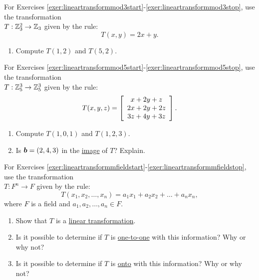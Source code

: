 \begin{multicols}{2}
\noindent For Exercises \ref{exer:lineartransformmod3start}-\ref{exer:lineartransformmod3stop}, use the transformation\\ $T : \Z_3^2 \to \Z_3$ given by the rule:
\[T(x, y) = 2x+y.\] 
\begin{enumerate}[!HW!]
\item\label{exer:lineartransformmod3start}\label{exer:lineartransformmod3stop} Compute $T(1,2)$ and $T(5,2)$. %
\end{enumerate} \mbox{}\columnbreak

\noindent For Exercises \ref{exer:lineartransformmod5start}-\ref{exer:lineartransformmod5stop}, use the transformation\\ $T : \Z_5^3 \to \Z_5^3$ given by the rule:
\[T(x, y, z) = \mtx{c}{x+2y+z\\ 2x+2y+2z\\ 3z+4y+3z}.\] 
\begin{enumerate}[!HW!]
\item\label{exer:lineartransformmod5start} Compute $T(1,0,1)$ and $T(1,2,3)$. %
\item \label{exer:lineartransformmod5stop} Is $\bb b = (2,4,3)$ in the \hyperref[def:linear]{image} of $T$? Explain. %
\end{enumerate}
\end{multicols}

\noindent For Exercises \ref{exer:lineartransformmfieldstart}-\ref{exer:lineartransformmfieldstop}, use the transformation\\ $T : F^n \to F$ given by the rule:
\[T(x_1, x_2, \ldots, x_n) = a_1x_1+a_2x_2+\ldots+a_nx_n,\] where $F$ is a field and $a_1, a_2, \ldots, a_n\in F$.
\begin{enumerate}[!HW!]
\item\label{exer:lineartransformmfieldstart} Show that $T$ is a \hyperref[def:linear]{linear transformation}.
\item Is it possible to determine if $T$ is \hyperref[def:injective]{one-to-one} with this information? Why or why not?
\item\label{exer:lineartransformmfieldstop} Is it possible to determine if $T$ is \hyperref[def:injective]{onto} with this information? Why or why not?
\end{enumerate}

\setlength{\columnseprule}{0pt}


\pagebreak